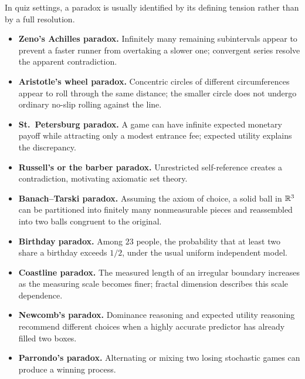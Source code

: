     \begin{fact}
        In quiz settings, a paradox is usually identified by its defining
        tension rather than by a full resolution.
        \begin{itemize}
            \item \textbf{Zeno's Achilles paradox.} Infinitely many remaining
                  subintervals appear to prevent a faster runner from overtaking
                  a slower one; convergent series resolve the apparent
                  contradiction.
            \item \textbf{Aristotle's wheel paradox.} Concentric circles of
                  different circumferences appear to roll through the same
                  distance; the smaller circle does not undergo ordinary
                  no-slip rolling against the line.
            \item \textbf{St.\ Petersburg paradox.} A game can have infinite
                  expected monetary payoff while attracting only a modest
                  entrance fee; expected utility explains the discrepancy.
            \item \textbf{Russell's or the barber paradox.} Unrestricted
                  self-reference creates a contradiction, motivating axiomatic
                  set theory.
            \item \textbf{Banach--Tarski paradox.} Assuming the axiom of choice,
                  a solid ball in $\mathbb{R}^3$ can be partitioned into finitely many
                  nonmeasurable pieces and reassembled into two balls congruent
                  to the original.
            \item \textbf{Birthday paradox.} Among $23$ people, the probability
                  that at least two share a birthday exceeds $1/2$, under the
                  usual uniform independent model.
            \item \textbf{Coastline paradox.} The measured length of an
                  irregular boundary increases as the measuring scale becomes
                  finer; fractal dimension describes this scale dependence.
            \item \textbf{Newcomb's paradox.} Dominance reasoning and expected
                  utility reasoning recommend different choices when a highly
                  accurate predictor has already filled two boxes.
            \item \textbf{Parrondo's paradox.} Alternating or mixing two losing
                  stochastic games can produce a winning process.
        \end{itemize}
    \end{fact}

